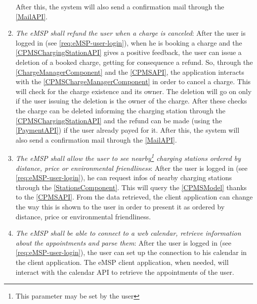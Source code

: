 \begin{enumerate}[label=\textbf{R\arabic*}]
    After this, the system will also send a confirmation mail through the \ref{MailAPI}.
    \label{req:eMSP-payment}
    \item \textit{The \ac{eMSP} shall refund the user when a charge is canceled}:
    After the user is logged in (see \ref{req:eMSP-user-login}), when he is booking a charge and the \ref{CPMSChargingStationAPI} gives a positive feedback, the user can issue a deletion of a booked charge, getting for consequence a refund.
    So, through the \ref{ChargeManagerComponent} and the \ref{CPMSAPI}, the application interacts with the \ref{CPMSChargeManagerComponent} in order to cancel a charge. This will check for the charge existence and its owner. The deletion will go on only if the user issuing the deletion is the owner of the charge.
    After these checks the charge can be deleted informing the charging station through the \ref{CPMSChargingStationAPI} and the refund can be made (using the \ref{PaymentAPI}) if the user already payed for it.
    After this, the system will also send a confirmation mail through the \ref{MailAPI}.
    \label{req:eMSP-refund}
    \item \textit{The \ac{eMSP} shall allow the user to see nearby\footnote{This parameter may be set by the user} charging stations ordered by distance, price or environmental friendliness}:
    After the user is logged in (see \ref{req:eMSP-user-login}), he can request infos of nearby charging stations through the \ref{StationsComponent}. This will query the \ref{CPMSModel} thanks to the \ref{CPMSAPI}. From the data retrieved, the client application can change the way this is shown to the user in order to present it as ordered by distance, price or environmental friendliness.
    \label{req:eMSP-see-stations}
    \item \textit{The \ac{eMSP} shall be able to connect to a web calendar, retrieve information about the appointments and parse them}:
    After the user is logged in (see \ref{req:eMSP-user-login}), the user can set up the connection to his calendar in the client application. The \ac{eMSP} client application, when needed, will interact with the calendar API to retrieve the appointments of the user.

\end{enumerate}
